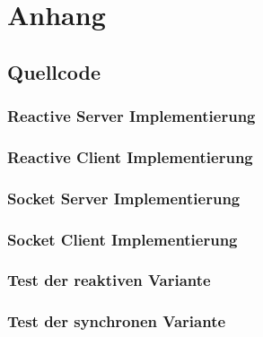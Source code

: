 \chapter*{Anhang}
\label{chap:APPENDIX}
\addtocounter{chapter}{1}
\setcounter{section}{0}
\section{Quellcode}
\label{chap:APPENDIX_SOURCECODE}
\subsection{Reactive Server Implementierung}

\subsection{Reactive Client Implementierung}

\subsection{Socket Server Implementierung}
\label{chap:programming:sync:server}

\subsection{Socket Client Implementierung}
\label{chap:programming:sync:client}

\subsection{Test der reaktiven Variante}
\label{chap:programming:test:async}

\subsection{Test der synchronen Variante}
\label{chap:programming:test:sync}
